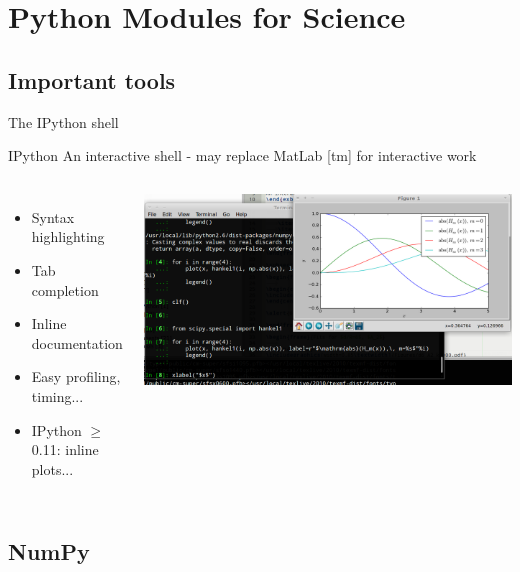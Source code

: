 \section{Python Modules for Science}

\subsection{Important tools}

\begin{frame}{The IPython shell}

\begin{exbox}{IPython}
An interactive shell - may replace MatLab [tm] for interactive work
\end{exbox}

\begin{columns}

\begin{itemize}
    \item Syntax highlighting
    \item Tab completion
    \item Inline documentation
    \item Easy profiling, timing...
    \item IPython $\ge$ 0.11: inline plots...
\end{itemize}


\includegraphics[width=\textwidth]{Figures/Ipython1.png}

\end{columns}

\end{frame}

\subsection{NumPy}


